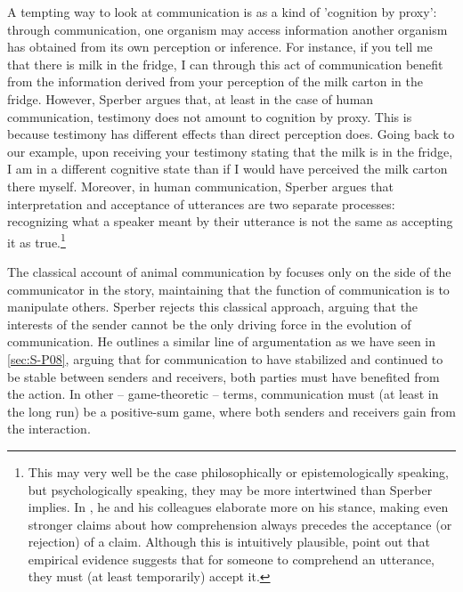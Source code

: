 A tempting way to look at communication is as a kind of 'cognition by proxy': through communication, one organism may access information another organism has obtained from its own perception or inference.
For instance,
if you tell me that there is milk in the fridge, I can through this act of communication benefit from the information derived from your perception of the milk carton in the fridge.
However, Sperber argues that, at least in the case of human communication, testimony does not amount to cognition by proxy. This is because testimony has different effects than direct perception does. Going back to our example, upon receiving your testimony stating that the milk is in the fridge, I am in a different cognitive state than if I would have perceived the milk carton there myself. Moreover, in human communication, Sperber argues that interpretation and acceptance of utterances are two separate processes: recognizing what a speaker meant by their utterance is not the same as accepting it as true.\footnote{This may very well be the case philosophically or epistemologically speaking, but psychologically speaking, they may be more intertwined than Sperber implies. In  \citet[\S 3]{Sperber10}, he and his colleagues elaborate more on his stance, making even stronger claims about how comprehension always precedes the acceptance (or rejection) of a claim. Although this is intuitively plausible, \citet{Lewandowsky12} point out that empirical evidence suggests that for someone to comprehend an utterance, they must (at least temporarily) accept it.}

The classical account of animal communication by \citet{DawkinsKrebs78} focuses only on the side of the communicator in the story, maintaining that the function of communication is to manipulate others. Sperber rejects this classical approach, arguing that the interests of the sender cannot be the only driving force in the evolution of communication.
He outlines a similar line of argumentation as we have seen in \cref{sec:S-P08},
arguing that for communication to have stabilized and continued to be stable between senders and receivers, both parties must have benefited from the action. In other -- game-theoretic -- terms, communication must (at least in the long run) be a positive-sum game, where both senders and receivers gain from the interaction.

